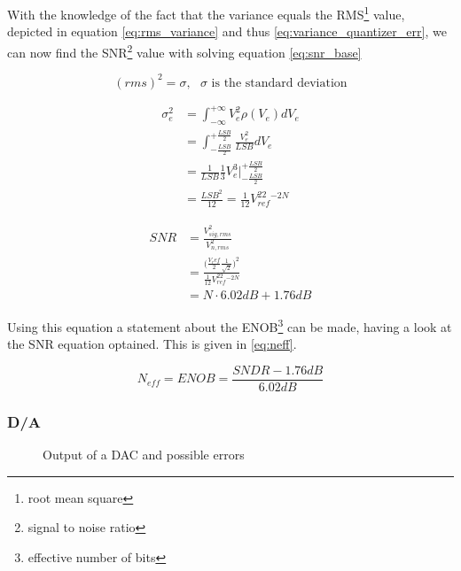 With the knowledge of the fact that the variance equals the RMS\footnote{root mean square} value, depicted in equation \ref{eq:rms_variance} and thus \ref{eq:variance_quantizer_err}, we can now find the SNR\footnote{signal to noise ratio} value with solving equation \ref{eq:snr_base}

\begin{equation}
    (rms)^2 = \sigma,\text{ $\sigma$ is the standard deviation}
    \label{eq:rms_variance}
\end{equation}

\begin{align}
    \sigma_e^2 &= \int_{-\infty}^{+\infty}V_e^2\rho(V_e)dV_e \\
    &= \int_{-\frac{LSB}{2}}^{+\frac{LSB}{2}}\frac{V_e^2}{LSB}dV_e \\
    &= \frac{1}{LSB}\frac{1}{3}V_e^3\Big|_{-\frac{LSB}{2}}^{+\frac{LSB}{2}} \\
    &= \frac{LSB^2}{12} = \frac{1}{12}V_{ref}^22^{-2N}
    \label{eq:variance_quantizer_err}
\end{align}

\begin{align}
    SNR &= \frac{V_{sig, rms}^2}{V_{n, rms}^2} \\
    &= \frac{\Big(\frac{V_ref}{2}\frac{1}{\sqrt{2}}\Big)^2}{\frac{1}{12}V_{ref}^22^{-2N}} \\
    &= N\cdot 6.02dB + 1.76dB
    \label{eq:snr_base}
\end{align}

Using this equation a statement about the ENOB\footnote{effective number of bits} can be made, having a look at the SNR equation optained. This is given in \ref{eq:neff}.

\begin{equation}
    N_{eff} = ENOB = \frac{SNDR - 1.76dB}{6.02dB}
    \label{eq:neff}
\end{equation}

\subsubsection[chain2DA]{ D/A}

\begin{figure}[H]
    \centering
    \caption{Output of a DAC and possible errors}
    \label{fig:dac_error_types}
\end{figure}

